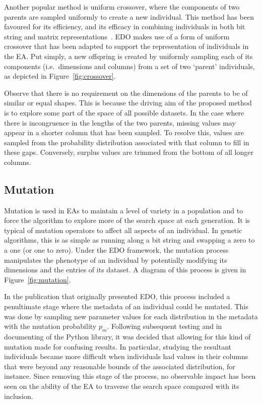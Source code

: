 Another popular method is uniform crossover, where the components of two parents
are sampled uniformly to create a new individual. This method has been favoured
for its efficiency, and its efficacy in combining individuals in both bit string
and matrix representations~\cite{Chen2018,Semenkin2012}. EDO makes use of
a form of uniform crossover that has been adapted to support the representation
of individuals in the EA. Put simply, a new offspring is created by uniformly
sampling each of its components (i.e.\ dimensions and columns) from a set of two
`parent' individuals, as depicted in Figure~\ref{fig:crossover}.


Observe that there is no requirement on the dimensions of the parents to be of
similar or equal shapes. This is because the driving aim of the proposed method
is to explore some part of the space of all possible datasets. In the case where
there is incongruence in the lengths of the two parents, missing values may
appear in a shorter column that has been sampled. To resolve this, values are
sampled from the probability distribution associated with that column to fill in
these gaps. Conversely, surplus values are trimmed from the bottom of all longer
columns.


\subsection{Mutation}\label{subsection:mutation}


Mutation is used in EAs to maintain a level of variety in a population and to
force the algorithm to explore more of the search space at each generation.
It is typical of mutation operators to affect all aspects of an individual. In
genetic algorithms, this is as simple as running along a bit string and swapping
a zero to a one (or one to zero). Under the EDO framework, the mutation process
manipulates the phenotype of an individual by potentially modifying its
dimensions and the entries of its dataset. A diagram of this process is given in
Figure~\ref{fig:mutation}.

In the publication that originally presented EDO, this process included a
penultimate stage where the metadata of an individual could be mutated. This was
done by sampling new parameter values for each distribution in the metadata with
the mutation probability \(p_m\). Following subsequent testing and in
documenting of the Python library, it was decided that allowing for this kind of
mutation made for confusing results. In particular, studying the resultant
individuals became more difficult when individuals had values in their columns
that were beyond any reasonable bounds of the associated distribution, for
instance. Since removing this stage of the process, no observable impact has
been seen on the ability of the EA to traverse the search space compared with
its inclusion.

